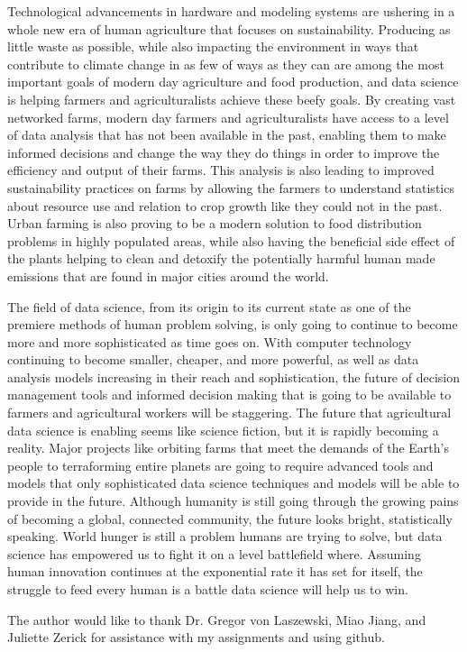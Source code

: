 \documentclass[sigconf]{acmart}
\begin{document}
Technological advancements in hardware and modeling systems are ushering in a whole new era of human agriculture that focuses on sustainability. Producing as little waste as possible, while also impacting the environment in ways that contribute to climate change in as few of ways as they can are among the most important goals of modern day agriculture and food production, and data science is helping farmers and agriculturalists achieve these beefy goals. By creating vast networked farms, modern day farmers and agriculturalists have access to a level of data analysis that has not been available in the past, enabling them to make informed decisions and change the way they do things in order to improve the efficiency and output of their farms. This analysis is also leading to improved sustainability practices on farms by allowing the farmers to understand statistics about resource use and relation to crop growth like they could not in the past. Urban farming is also proving to be a modern solution to food distribution problems in highly populated areas, while also having the beneficial side effect of the plants helping to clean and detoxify the potentially harmful human made emissions that are found in major cities around the world.

The field of data science, from its origin to its current state as one of the premiere methods of human problem solving, is only going to continue to become more and more sophisticated as time goes on. With computer technology continuing to become smaller, cheaper, and more powerful, as well as data analysis models increasing in their reach and sophistication, the future of decision management tools and informed decision making that is going to be available to farmers and agricultural workers will be staggering. The future that agricultural data science is enabling seems like science fiction, but it is rapidly becoming a reality. Major projects like orbiting farms that meet the demands of the Earth's people to terraforming entire planets are going to require advanced tools and models that only sophisticated data science techniques and models will be able to provide in the future. Although humanity is still going through the growing pains of becoming a global, connected community, the future looks bright, statistically speaking. World hunger is still a problem humans are trying to solve, but data science has empowered us to fight it on a level battlefield where. Assuming human innovation continues at the exponential rate it has set for itself, the struggle to feed every human is a battle data science will help us to win.

\begin{acks}

The author would like to thank Dr. Gregor von Laszewski, Miao Jiang, and Juliette Zerick for assistance with my assignments and using github.

\end{acks}



 




\end{document}
